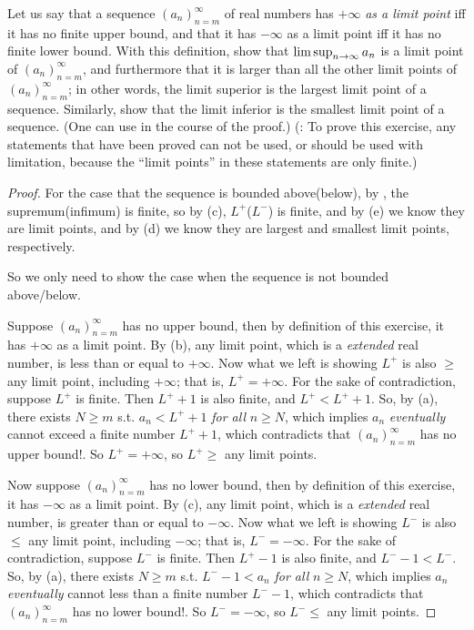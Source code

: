 \begin{exercise} \label{exercise 6.4.8}
Let us say that a sequence \((a_n)_{n = m}^{\infty}\) of real numbers has \(+\infty\) \emph{as a limit point} iff it has no finite upper bound,
and that it has \(-\infty\) as a limit point iff it has no finite lower bound.
With this definition, show that \(\limsup_{n \to \infty} a_n\) is a limit point of \((a_n)_{n = m}^{\infty}\), and furthermore that it is larger than all the other limit points of \((a_n)_{n = m}^{\infty}\);
in other words, the limit superior is the largest limit point of a sequence.
Similarly, show that the limit inferior is the smallest limit point of a sequence.
(One can use  in the course of the proof.)
(: To prove this exercise, any statements that have been proved  can not be used, or should be used with limitation,
because the ``limit points'' in these statements are only finite.)
\end{exercise}

\begin{proof}
For the case that the sequence is bounded above(below), by , the supremum(infimum) is finite, so by (c), \(L^+\)(\(L^-\)) is finite,
and by (e) we know they are limit points, and by (d) we know they are largest and smallest limit points, respectively.

So we only need to show the case when the sequence is not bounded above/below.

Suppose \((a_n)_{n = m}^{\infty}\) has no upper bound, then by definition of this exercise, it has \(+\infty\) as a limit point.
By (b), any limit point, which is a \emph{extended} real number, is less than or equal to \(+\infty\).
Now what we left is showing \(L^+\) is also \(\ge\) any limit point, including \(+\infty\);
that is, \(L^+ = +\infty\).
For the sake of contradiction, suppose \(L^+\) is finite.
Then \(L^+ + 1\) is also finite, and \(L^+ < L^+ + 1\).
So, by (a), there exists \(N \ge m\) s.t. \(a_n < L^+ + 1\) \emph{for all} \(n \ge N\),
which implies \(a_n\) \emph{eventually} cannot exceed a finite number \(L^+ + 1\),
which contradicts that \((a_n)_{n = m}^{\infty}\) has no upper bound!.
So \(L^+ = +\infty\), so \(L^+ \ge\) any limit points.

Now suppose \((a_n)_{n = m}^{\infty}\) has no lower bound, then by definition of this exercise, it has \(-\infty\) as a limit point.
By (c), any limit point, which is a \emph{extended} real number, is greater than or equal to \(-\infty\).
Now what we left is showing \(L^-\) is also \(\le\) any limit point, including \(-\infty\);
that is, \(L^- = -\infty\).
For the sake of contradiction, suppose \(L^-\) is finite.
Then \(L^+ - 1\) is also finite, and \(L^- - 1 < L^-\).
So, by (a), there exists \(N \ge m\) s.t. \(L^- - 1 < a_n\) \emph{for all} \(n \ge N\),
which implies \(a_n\) \emph{eventually} cannot less than a finite number \(L^- - 1\), which contradicts that \((a_n)_{n = m}^{\infty}\) has no lower bound!.
So \(L^- = -\infty\), so \(L^- \le\) any limit points.
\end{proof}

